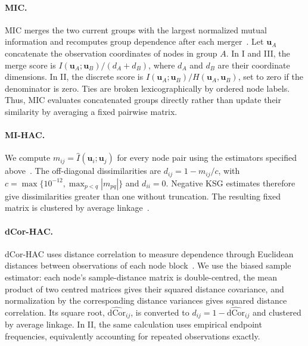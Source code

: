 \documentclass[fleqn,10pt]{wlscirep}
\begin{document}
\paragraph{MIC.}
\label{app:mic}
MIC merges the two current groups with the largest normalized mutual information and recomputes group dependence after each merger~\cite{Kraskov2005HierarchicalMI}. Let $\boldsymbol{u}_A$ concatenate the observation coordinates of nodes in group $A$. In I and III, the merge score is $I(\boldsymbol{u}_A;\boldsymbol{u}_B)/(d_A+d_B)$, where $d_A$ and $d_B$ are their coordinate dimensions. In II, the discrete score is $I(\boldsymbol{u}_A;\boldsymbol{u}_B)/H(\boldsymbol{u}_A,\boldsymbol{u}_B)$, set to zero if the denominator is zero. Ties are broken lexicographically by ordered node labels. Thus, MIC evaluates concatenated groups directly rather than update their similarity by averaging a fixed pairwise matrix. 

\paragraph{MI-HAC.}
\label{app:pairwise_mi}
We compute $m_{ij}=\widehat I(\boldsymbol{u}_i;\boldsymbol{u}_j)$ for every node pair using the estimators specified above~\cite{Kraskov2004EstimatingMI}. The off-diagonal dissimilarities are $d_{ij}=1-m_{ij}/c$, with $c=\max\{10^{-12},\max_{p<q}|m_{pq}|\}$ and $d_{ii}=0$. Negative KSG estimates therefore give dissimilarities greater than one without truncation. The resulting fixed matrix is clustered by average linkage~\cite{Mullner2011Hierarchical}.

\paragraph{dCor-HAC.}
\label{app:distance_correlation}
dCor-HAC uses distance correlation to measure dependence through Euclidean distances between observations of each node block~\cite{Szekely2007DistanceCorrelation}. We use the biased sample estimator: each node's sample-distance matrix is double-centred, the mean product of two centred matrices gives their squared distance covariance, and normalization by the corresponding distance variances gives squared distance correlation. Its square root, $\widehat{\mathrm{dCor}}_{ij}$, is converted to $d_{ij}=1-\widehat{\mathrm{dCor}}_{ij}$ and clustered by average linkage. In II, the same calculation uses empirical endpoint frequencies, equivalently accounting for repeated observations exactly.
\end{document}
